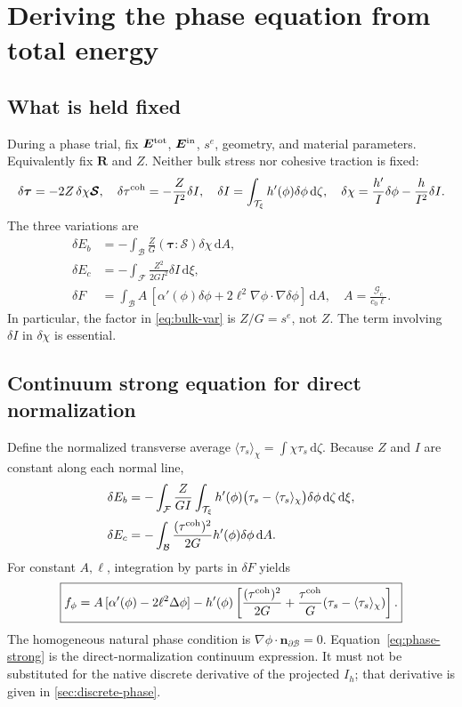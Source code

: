 \documentclass[11pt,a4paper]{article}
\newcommand{\B}{\mathcal B}
\newcommand{\F}{\mathcal F}
\newcommand{\Smat}{\bm{\mathcal S}}
\newcommand{\tauv}{\bm\tau}
\newcommand{\R}{\bm R}
\newcommand{\Ein}{\bm E^{\rm in}}
\newcommand{\Etot}{\bm E^{\rm tot}}
\newcommand{\qcoh}{\tau^{\rm coh}}
\newcommand{\Gc}{\mathcal G_c}
\newcommand{\dd}{\,\mathrm d}
\begin{document}
\section{Deriving the phase equation from total energy}
\label{sec:phase}

\subsection{What is held fixed}

During a phase trial, fix $\Etot$, $\Ein$, $s^e$, geometry, and material
parameters. Equivalently fix $\R$ and $Z$. Neither bulk stress nor cohesive
traction is fixed:
\begin{equation}
 \delta\tauv=-2Z\,\delta\chi\Smat,
 \quad \delta\qcoh=-\frac Z{I^2}\delta I,
 \quad \delta I=\int_{\mathcal T_\xi}h'(\phi)\delta\phi\dd\zeta,
 \quad \delta\chi=\frac{h'}I\delta\phi-\frac h{I^2}\delta I.
 \label{eq:phase-variations}
\end{equation}
The three variations are
\begin{align}
 \delta E_b&=-\int_\B\frac ZG(\tauv:\Smat)\delta\chi\dd A,
 \label{eq:bulk-var}\\
 \delta E_c&=-\int_\F\frac{Z^2}{2GI^2}\delta I\dd\xi,
 \label{eq:coh-var}\\
 \delta F&=\int_\B A\,[\alpha'(\phi)\delta\phi
                   +2\ell^2\nabla\phi\cdot\nabla\delta\phi]\dd A,
 \quad A=\frac{\Gc}{c_0\ell}.
 \label{eq:fracture-var}
\end{align}
In particular, the factor in \cref{eq:bulk-var} is $Z/G=s^e$, not $Z$.
The term involving $\delta I$ in $\delta\chi$ is essential.

\subsection{Continuum strong equation for direct normalization}

Define the normalized transverse average
$\langle\tau_s\rangle_\chi=\int\chi\tau_s\dd\zeta$.
Because $Z$ and $I$ are constant along each normal line,
\begin{align}
 \delta E_b
 &=-\int_\F\frac Z{GI}\int_{\mathcal T_\xi}
     h'(\phi)\bigl(\tau_s-\langle\tau_s\rangle_\chi\bigr)
     \delta\phi\dd\zeta\dd\xi,\\
 \delta E_c
 &=-\int_\B\frac{(\qcoh)^2}{2G}h'(\phi)\delta\phi\dd A.
\end{align}
For constant $A,\ell$, integration by parts in $\delta F$ yields
\begin{equation}
 \boxed{f_\phi=A\,[\alpha'(\phi)-2\ell^2\Delta\phi]
 -h'(\phi)\left[
       \frac{(\qcoh)^2}{2G}
      +\frac{\qcoh}G(\tau_s-\langle\tau_s\rangle_\chi)
        \right].}
 \label{eq:phase-strong}
\end{equation}
The homogeneous natural phase condition is
$\nabla\phi\cdot\bm n_{\partial\B}=0$.
Equation~\eqref{eq:phase-strong} is the direct-normalization continuum
expression. It must not be substituted for the native discrete derivative of
the projected $I_h$; that derivative is given in \cref{sec:discrete-phase}.
\end{document}
